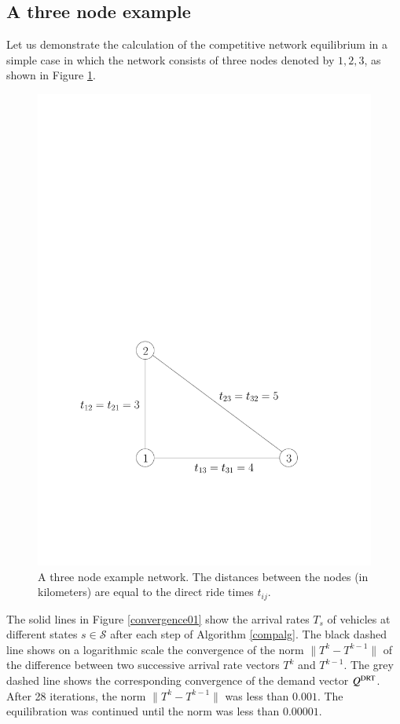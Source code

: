 \documentclass[dissertation,draft*]{aaltoseries}
\begin{document}
\subsection{A three node example}
\label{compexample}
Let us demonstrate the calculation of the competitive network equilibrium in a simple case 
in which the network consists of three nodes denoted by $1,2,3$, as shown in Figure \ref{3node01}. 

\begin{figure}[ht]
\begin{center}
\includegraphics[width=0.4\columnwidth]{3node01}
\caption{A three node example network. The distances between the nodes 
(in kilometers) are equal to the direct ride times $t_{ij}$.}
\label{3node01}
\end{center}
\end{figure}

The solid lines in Figure \ref{convergence01} show the
arrival rates $T_s$ of vehicles at different states $s \in \mathcal{S}$ after each step of Algorithm \ref{compalg}. 
The black dashed line shows on a logarithmic scale the convergence of the norm $\|T^k - T^{k-1}\|$ 
of the difference between two successive arrival rate vectors $T^k$ and $T^{k-1}$.
The grey dashed line shows the corresponding convergence of the demand vector $Q^{\rm DRT}$.
After 28 iterations, the norm $\|T^k - T^{k-1}\|$ was less than $0.001$. 
The equilibration was continued until the norm was less than $0.00001$.
\end{document}
